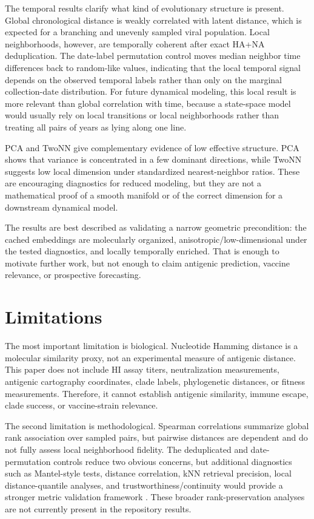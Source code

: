 \documentclass[11pt]{article}
\begin{document}
The temporal results clarify what kind of evolutionary structure is present. Global chronological distance is weakly correlated with latent distance, which is expected for a branching and unevenly sampled viral population. Local neighborhoods, however, are temporally coherent after exact HA+NA deduplication. The date-label permutation control moves median neighbor time differences back to random-like values, indicating that the local temporal signal depends on the observed temporal labels rather than only on the marginal collection-date distribution. For future dynamical modeling, this local result is more relevant than global correlation with time, because a state-space model would usually rely on local transitions or local neighborhoods rather than treating all pairs of years as lying along one line.

PCA and TwoNN give complementary evidence of low effective structure. PCA shows that variance is concentrated in a few dominant directions, while TwoNN suggests low local dimension under standardized nearest-neighbor ratios. These are encouraging diagnostics for reduced modeling, but they are not a mathematical proof of a smooth manifold or of the correct dimension for a downstream dynamical model.

The results are best described as validating a narrow geometric precondition: the cached embeddings are molecularly organized, anisotropic/low-dimensional under the tested diagnostics, and locally temporally enriched. That is enough to motivate further work, but not enough to claim antigenic prediction, vaccine relevance, or prospective forecasting.

\section{Limitations}

The most important limitation is biological. Nucleotide Hamming distance is a molecular similarity proxy, not an experimental measure of antigenic distance. This paper does not include HI assay titers, neutralization measurements, antigenic cartography coordinates, clade labels, phylogenetic distances, or fitness measurements. Therefore, it cannot establish antigenic similarity, immune escape, clade success, or vaccine-strain relevance.

The second limitation is methodological. Spearman correlations summarize global rank association over sampled pairs, but pairwise distances are dependent and do not fully assess local neighborhood fidelity. The deduplicated and date-permutation controls reduce two obvious concerns, but additional diagnostics such as Mantel-style tests, distance correlation, kNN retrieval precision, local distance-quantile analyses, and trustworthiness/continuity would provide a stronger metric validation framework \cite{mantel1967detection,szekely2007distance,lee2009quality}. These broader rank-preservation analyses are not currently present in the repository results.
\end{document}
